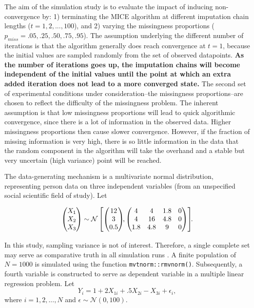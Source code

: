 \documentclass[Royal,times,sageh]{sagej}
\begin{document}
The aim of the simulation study is to evaluate the impact of inducing
non-convergence by: 1) terminating the MICE algorithm at different
imputation chain lengths (\(t = 1, 2,..., 100\)), and 2) varying the
missingness proportions (\(p_{miss} =.05,.25,.50,.75,.95\)). The
assumption underlying the different number of iterations is that the
algorithm generally does reach convergence at \(t=1\), because the
initial values are sampled randomly from the set of observed datapoints.
\textbf{As the number of iterations goes up, the imputation chains will
become independent of the initial values until the point at which an
extra added iteration does not lead to a more converged state.} The
second set of experimental conditions under consideration--the
missingness proportions--are chosen to reflect the difficulty of the
missingness problem. The inherent assumption is that low missingness
proportions will lead to quick algorithmic convergence, since there is a
lot of information in the observed data. Higher missingness proportions
then cause slower convergence. However, if the fraction of missing
information is very high, there is so little information in the data
that the random component in the algorithm will take the overhand and a
stable but very uncertain (high variance) point will be reached.

The data-generating mechanism is a multivariate normal distribution,
representing person data on three independent variables (from an
unspecified social scientific field of study). Let

\begin{align*}
\begin{pmatrix}X_1\\
X_2\\
X_3
\end{pmatrix} \sim \mathcal{N}
\begin{bmatrix}
\begin{pmatrix}
12\\
3\\
0.5
\end{pmatrix}\!\!,
\begin{pmatrix}
4 & 4 & 1.8 & 0\\
4 & 16 & 4.8 & 0\\
1.8 & 4.8 & 9 & 0
\end{pmatrix}
\end{bmatrix}\!\!\text{.}\\[2\jot]
\end{align*} In this study, sampling variance is not of interest.
Therefore, a single complete set may serve as comparative truth in all
simulation runs \citep{vinknd}. A finite population of \(N=1000\) is
simulated using the function \texttt{mvtnorm::rmvnorm()}. Subsequently,
a fourth variable is constructed to serve as dependent variable in a
multiple linear regression problem. Let \[
Y_i = 1 + 2X_{1i} +.5X_{2i} - X_{3i} + \epsilon_i ,
\] where \(i = 1, 2,..., N\) and \(\epsilon \sim \mathcal{N}(0, 100)\).
\end{document}
